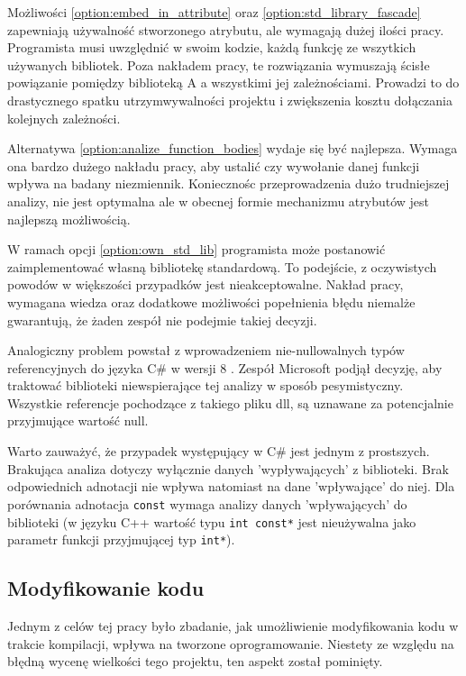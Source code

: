 Możliwości \ref{option:embed_in_attribute} oraz \ref{option:std_library_fascade} zapewniają używalność stworzonego atrybutu, ale wymagają dużej ilości pracy.
Programista musi uwzględnić w swoim kodzie, każdą funkcję ze wszytkich używanych bibliotek.
Poza nakładem pracy, te rozwiązania wymuszają ścisłe powiązanie pomiędzy biblioteką A a wszystkimi jej zależnościami.
Prowadzi to do drastycznego spatku utrzymwywalności projektu i zwiększenia kosztu dołączania kolejnych zależności.

Alternatywa \ref{option:analize_function_bodies} wydaje się być najlepsza. 
Wymaga ona bardzo dużego nakładu pracy, aby ustalić czy wywołanie danej funkcji wpływa na badany niezmiennik.
Koniecznośc przeprowadzenia dużo trudniejszej analizy, nie jest optymalna ale w obecnej formie mechanizmu atrybutów jest najlepszą możliwością.

W ramach opcji \ref{option:own_std_lib} programista może postanowić zaimplementować własną bibliotekę standardową.
To podejście, z oczywistych powodów w większości przypadków jest nieakceptowalne.
Nakład pracy, wymagana wiedza oraz dodatkowe możliwości popełnienia błędu niemalże gwarantują, że żaden zespół nie podejmie takiej decyzji.

Analogiczny problem powstał z wprowadzeniem nie-nullowalnych typów referencyjnych do języka C\# w wersji 8 \cite{wagner_2021, strauss2019new_cs_new_features}.
Zespół Microsoft podjął decyzję, aby traktować biblioteki niewspierające tej analizy w sposób pesymistyczny.
Wszystkie referencje pochodzące z takiego pliku dll, są uznawane za potencjalnie przyjmujące wartość null.

Warto zauważyć, że przypadek występujący w C\# jest jednym z prostszych.
Brakująca analiza dotyczy wyłącznie danych 'wypływających' z biblioteki.
Brak odpowiednich adnotacji nie wpływa natomiast na dane 'wpływające' do niej.
Dla porównania adnotacja \lstinline{const} wymaga analizy danych 'wpływających' do biblioteki (w języku C++ wartość typu \lstinline{int const*} jest nieużywalna jako parametr funkcji przyjmującej typ \lstinline{int*}).

\subsection{Modyfikowanie kodu}

Jednym z celów tej pracy było zbadanie, jak umożliwienie modyfikowania kodu w trakcie kompilacji, wpływa na tworzone oprogramowanie.
Niestety ze względu na błędną wycenę wielkości tego projektu, ten aspekt został pominięty.

